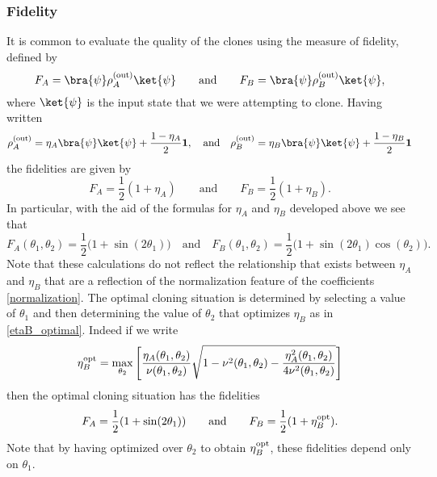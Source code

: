 \documentclass[reqno]{amsart}
\numberwithin{lemma}{section}
\numberwithin{proposition}{section}
\begin{document}
\subsubsection{Fidelity}
It is common to evaluate the quality of the clones using the measure of fidelity, defined by
\begin{equation*}
	F_{A} = \bra{\psi} \rho_{A}^{\textnormal{(out)}} \ket{\psi} \qquad \text{and} \qquad F_{B} = \bra{\psi} \rho_{B}^{\textnormal{(out)}} \ket{\psi},
\end{equation*}
where $\ket{\psi}$ is the input state that we were attempting to clone. Having written
\begin{equation*}
	\rho_{A}^{\textnormal{(out)}} = \eta_{A} \bra{\psi} \ket{\psi} + \frac{1 - \eta_{A}}{2} \mathbf{1}, \quad \text{and} \quad
	\rho_{B}^{\textnormal{(out)}} = \eta_{B} \bra{\psi} \ket{\psi} + \frac{1 - \eta_{B}}{2} \mathbf{1}
\end{equation*}
the fidelities are given by
\begin{equation*}
	F_{A} = \frac{1}{2}(1 + \eta_{A}) \qquad \text{and} \qquad F_{B} = \frac{1}{2}(1 + \eta_{B}).
\end{equation*}
In particular, with the aid of the formulas for $\eta_{A}$ and $\eta_{B}$ developed above we see that
\begin{equation*}
	F_{A}(\theta_{1}, \theta_{2}) = \frac{1}{2} \Big (1 + \sin(2\theta_{1}) \Big ) \quad \text{and} \quad
	F_{B}(\theta_{1}, \theta_{2}) = \frac{1}{2} \Big ( 1 + \sin(2\theta_{1}) \cos(\theta_{2}) \Big ).
\end{equation*}
Note that these calculations do not reflect the relationship that exists between $\eta_{A}$ and $\eta_{B}$ that are a reflection of the normalization feature of the coefficients \eqref{normalization}. The optimal cloning situation is determined by selecting a value of $\theta_{1}$ and then determining the value of $\theta_{2}$ that optimizes $\eta_{B}$ as in \eqref{etaB_optimal}. Indeed if we write
\begin{equation*}
	\eta_{B}^{\textnormal{opt}} = \max_{\theta_{2}} \left [ \frac{\eta_{A}(\theta_{1},\theta_{2})}{\nu(\theta_{1}, \theta_{2})} \sqrt{1 - \nu^{2}(\theta_{1},\theta_{2}) - \frac{\eta_{A}^{2}(\theta_{1},\theta_{2})}{4 \nu^{2}(\theta_{1}, \theta_{2})}}\right ]
\end{equation*}
then the optimal cloning situation has the fidelities
\begin{equation*}
	F_{A} = \frac{1}{2}(1 + \sin(2 \theta_{1})) \qquad \text{and} \qquad F_{B} = \frac{1}{2} (1 + \eta_{B}^{\textnormal{opt}}).
\end{equation*}
Note that by having optimized over $\theta_{2}$ to obtain $\eta_{B}^{\textnormal{opt}}$, these fidelities depend only on $\theta_{1}$.
\end{document}
